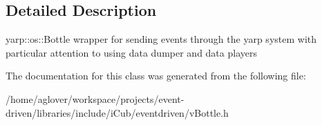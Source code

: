 \subsection{Detailed Description}
yarp\+::os\+::\+Bottle wrapper for sending events through the yarp system with particular attention to using data dumper and data players 

The documentation for this class was generated from the following file\+:\begin{DoxyCompactItemize}
\item 
/home/aglover/workspace/projects/event-\/driven/libraries/include/i\+Cub/eventdriven/v\+Bottle.\+h\end{DoxyCompactItemize}
